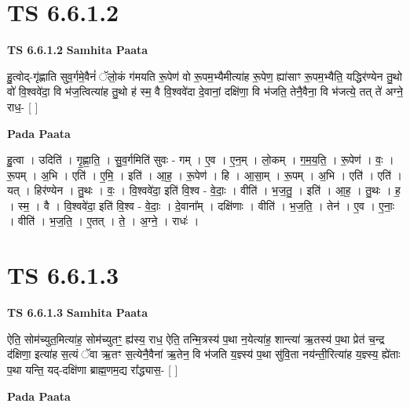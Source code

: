 \documentclass[17pt]{extarticle}
\begin{document}

\section{ TS 6.6.1.2 }

\textbf{TS 6.6.1.2 } \newline
\textbf{Samhita Paata} \newline

हु॒त्वोद्-गृ॑ह्णाति सुव॒र्गमे॒वैनं॑ ॅलो॒कं ग॑मयति रू॒पेण॑ वो रू॒पम॒भ्यैमीत्या॑ह रू॒पेण॒ ह्या॑साꣳ रू॒पम॒भ्यैति॒ यद्धिर॑ण्येन तु॒थो वो॑ वि॒श्ववे॑दा॒ वि भ॑ज॒त्वित्या॑ह तु॒थो ह॑ स्म॒ वै वि॒श्ववे॑दा दे॒वानां॒ दक्षि॑णा॒ वि भ॑जति॒ तेनै॒वैना॒ वि भ॑जत्ये॒ तत् ते॑ अग्ने॒ राध॒- [  ] \newline

\textbf{Pada Paata} \newline

हु॒त्वा । उदिति॑ । गृ॒ह्णा॒ति॒ । सु॒व॒र्गमिति॑ सुवः - गम् । ए॒व । ए॒न॒म् । लो॒कम् । ग॒म॒य॒ति॒ । रू॒पेण॑ । वः॒ । रू॒पम् । अ॒भि । एति॑ । ए॒मि॒ । इति॑ । आ॒ह॒ । रू॒पेण॑ । हि । आ॒सा॒म् । रू॒पम् । अ॒भि । एति॑ । एति॑ । यत् । हिर॑ण्येन । तु॒थः । वः॒ । वि॒श्ववे॑दा॒ इति॑ वि॒श्व - वे॒दाः॒ । वीति॑ । भ॒ज॒तु॒ । इति॑ । आ॒ह॒ । तु॒थः । ह॒ । स्म॒ । वै । वि॒श्ववे॑दा॒ इति॑ वि॒श्व - वे॒दाः॒ । दे॒वाना᳚म् । दक्षि॑णाः । वीति॑ । भ॒ज॒ति॒ । तेन॑ । ए॒व । ए॒नाः॒ । वीति॑ । भ॒ज॒ति॒ । ए॒तत् । ते॒ । अ॒ग्ने॒ । राधः॑ ।  \newline





\section{ TS 6.6.1.3 }

\textbf{TS 6.6.1.3 } \newline
\textbf{Samhita Paata} \newline

ऐति॒ सोम॑च्युत॒मित्या॑ह॒ सोम॑च्युतꣳ॒॒ ह्य॑स्य॒ राध॒ ऐति॒ तन्मि॒त्रस्य॑ प॒था न॒येत्या॑ह॒ शान्त्या॑ ऋ॒तस्य॑ प॒था प्रेत॑ च॒न्द्र द॑क्षिणा॒ इत्या॑ह स॒त्यं ॅवा ऋ॒तꣳ स॒त्येनै॒वैना॑ ऋ॒तेन॒ वि भ॑जति य॒ज्ञ्स्य॑ प॒था सु॑वि॒ता नय॑न्ती॒रित्या॑ह य॒ज्ञ्स्य॒ ह्ये॑ताः प॒था यन्ति॒ यद्-दक्षि॑णा ब्राह्म॒णम॒द्य रा᳚द्ध्यास॒- [  ] \newline

\textbf{Pada Paata} \newline
\end{document}
